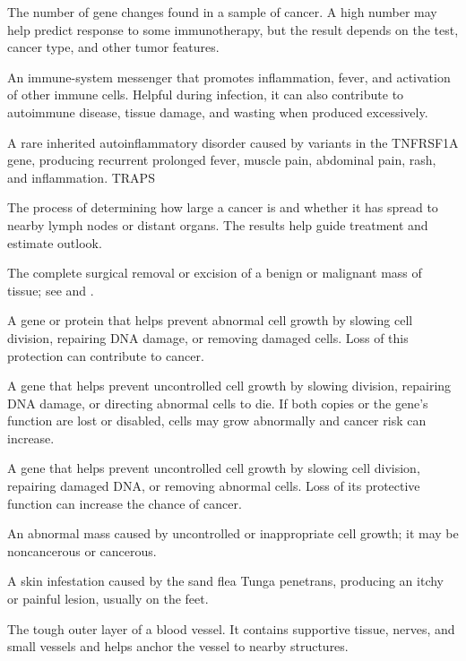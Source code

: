  The number of gene changes found in a sample of cancer. A high number may help predict response to some immunotherapy, but the result depends on the test, cancer type, and other tumor features.

 An immune-system messenger that promotes inflammation, fever, and activation of other immune cells. Helpful during infection, it can also contribute to autoimmune disease, tissue damage, and wasting when produced excessively.

 A rare inherited autoinflammatory disorder caused by variants in the TNFRSF1A gene, producing recurrent prolonged fever, muscle pain, abdominal pain, rash, and inflammation.
\synonyms
TRAPS

 The process of determining how large a cancer is and whether it has spread to nearby lymph nodes or distant organs. The results help guide treatment and estimate outlook.

 The complete surgical removal or excision of a benign or malignant mass of tissue; see  and .

 A gene or protein that helps prevent abnormal cell growth by slowing cell division, repairing DNA damage, or removing damaged cells. Loss of this protection can contribute to cancer.

 A gene that helps prevent uncontrolled cell growth by slowing division, repairing DNA damage, or directing abnormal cells to die. If both copies or the gene’s function are lost or disabled, cells may grow abnormally and cancer risk can increase.

 A gene that helps prevent uncontrolled cell growth by slowing cell division, repairing damaged DNA, or removing abnormal cells. Loss of its protective function can increase the chance of cancer.

 An abnormal mass caused by uncontrolled or inappropriate cell growth; it may be noncancerous or cancerous.

 A skin infestation caused by the sand flea Tunga penetrans, producing an itchy or painful lesion, usually on
the feet.

 The tough outer layer of a blood vessel. It contains supportive tissue, nerves, and small vessels and helps anchor the vessel to nearby structures.

